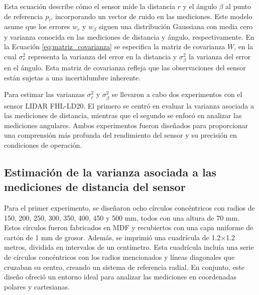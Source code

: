 Esta ecuación describe cómo el sensor mide la distancia $r$ y el ángulo $\beta$ al punto de referencia $p_i$, incorporando un vector de ruido en las mediciones. Este modelo asume que los errores $w_r$ y $w_\beta$ siguen  una distribución Gaussiana con media cero y varianza conocida en las mediciones de distancia y ángulo, respectivamente. En la Ecuación \ref{eq:matriz_covarianza} se especifica la matriz de covarianza $W$, en la cual $\sigma_r^2$ representa la varianza del error en la distancia y $\sigma_\beta^2$ la varianza del error en el ángulo. Esta matriz de covarianza refleja que las observaciones del sensor están sujetas a una incertidumbre inherente.

Para estimar las varianzas $\sigma_r^2$ y $\sigma_\beta^2$ se llevaron a cabo dos experimentos con el sensor LIDAR FHL-LD20.  El primero se centró en evaluar la varianza asociada a las mediciones de distancia, mientras que el segundo se enfocó en analizar las mediciones angulares. Ambos experimentos fueron diseñados para proporcionar una comprensión más profunda del rendimiento del sensor y su precisión en condiciones de operación.

\subsection{Estimación de la varianza asociada a las mediciones de distancia del sensor}
Para el primer experimento, se diseñaron ocho círculos concéntricos con radios de 150, 200, 250, 300, 350, 400, 450 y 500 mm, todos con una altura de 70 mm. Estos círculos fueron fabricados en MDF y recubiertos con una capa uniforme de cartón de 1 mm de grosor. Además, se imprimió una cuadrícula de 1.2$\times$1.2 metros, dividida en intervalos de un centímetro. Esta cuadrícula incluía una serie de círculos concéntricos con los radios mencionados y líneas diagonales que cruzaban su centro, creando un sistema de referencia radial. En conjunto, este diseño ofreció un entorno ideal para analizar las mediciones en coordenadas polares y cartesianas.

